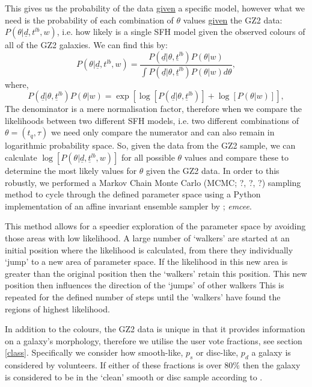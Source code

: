 \documentclass{mn2e}
\begin{document}
This gives us the probability of the data \underline{given} a specific model, however what we need is the probability of each combination of $\theta$ values \underline{given} the GZ2 data: $P(\theta|\underline{d}, t^{lb}, w)$, i.e. how likely is a single SFH model given the observed colours of all of the GZ2 galaxies. We can find this by:
\begin{equation*}
P(\theta|\underline{d}, t^{lb}, w) = \frac{P(\underline{d}|\theta, \underline{t}^{lb})P(\theta | w)}{\int P(\underline{d}|\theta, \underline{t}^{lb})P(\theta | w) d\theta},
\end{equation*}
where,
\begin{equation*}
P(\underline{d}|\theta, \underline{t}^{lb})P(\theta | w) = \exp{\left[\log{[P(\underline{d}|\theta, \underline{t}^{lb})]} + \log{[P(\theta | w)]}\right]},
\end{equation*}
The denominator is a mere normalisation factor, therefore when we compare the likelihoods between two different SFH models, i.e. two different combinations of $\theta = (t_{q}, \tau)$ we need only compare the numerator and can also remain in logarithmic probability space. So, given the data from the GZ2 sample, we can calculate $\log[P(\theta|\underline{d}, \underline{t}^{lb}, w)]$ for all possible $\theta$ values and compare these to determine the most likely values for $\theta$ given the GZ2 data. In order to this robustly, we performed a Markov Chain Monte Carlo (MCMC; ?, ?, ?) sampling method to cycle through the defined parameter space using a Python implementation of an affine invariant ensemble sampler by \cite{Dan}; \emph{emcee}.

This method allows for a speedier exploration of the parameter space by avoiding those areas with low likelihood. A large number of `walkers' are started at an initial position where the likelihood is calculated, from there they individually `jump' to a new area of parameter space. If the likelihood in this new area is greater than the original position then the `walkers' retain this position. This new position then influences the direction of the  `jumps' of other walkers  This is repeated for the defined number of steps until the 'walkers' have found the regions of highest likelihood.

In addition to the colours, the GZ2 data is unique in that it provides information on a galaxy's morphology, therefore we utilise the user vote fractions, see section \ref{class}. Specifically we consider how smooth-like, $p_s$ or disc-like, $p_d$ a galaxy is considered by volunteers. If either of these fractions is over $80\%$ then the galaxy is considered to be in the `clean' smooth or disc sample according to \citet{GZ2}. 
\end{document}
